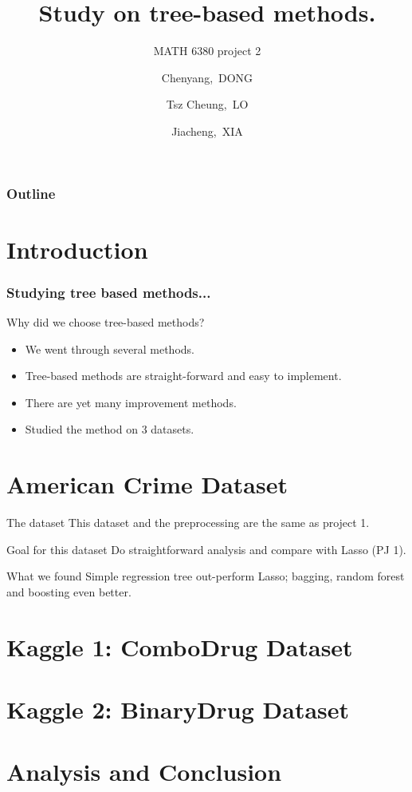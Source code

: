 \documentclass{beamer}
\title[MATH 6380 Project 2]{Study on tree-based methods.}
\subtitle{MATH 6380 project 2}
\author[C.Dong, T.C.LO, J.Xia]
{Chenyang,~DONG \and Tsz Cheung,~LO \and Jiacheng,~XIA}
\begin{document}
\frame{\titlepage}

\begin{frame}
\frametitle{Outline}
\tableofcontents
\end{frame}

\section{Introduction}
\begin{frame}
\frametitle{Studying tree based methods...}
Why did we choose tree-based methods?
\pause
\begin{itemize}
\item We went through several methods.
\pause
\item Tree-based methods are straight-forward and easy to implement.
\pause
\item There are yet many improvement methods.
\pause
\item Studied the method on 3 datasets.
\end{itemize}
\end{frame}

\section{American Crime Dataset}
\begin{frame}
\begin{block}{The dataset}
This dataset and the preprocessing are the same as project 1.
\end{block}
\pause
\begin{exampleblock}{Goal for this dataset}
Do straightforward analysis and compare with Lasso (PJ 1).
\end{exampleblock}
\begin{alertblock}{What we found}
Simple regression tree out-perform Lasso; bagging, random forest and boosting even better.
\end{alertblock}
\end{frame}

\section{Kaggle 1: ComboDrug Dataset }

\section{Kaggle 2: BinaryDrug Dataset}

\section{Analysis and Conclusion}
\end{document}
